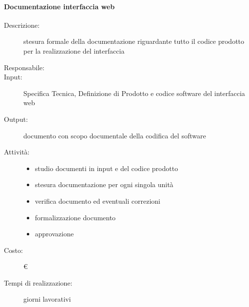 \paragraph{Documentazione interfaccia web}
\begin{description}
\item[Descrizione:] stesura formale della documentazione riguardante tutto il codice prodotto
per la realizzazione del interfaccia 

\item[Responsabile:] 

\item[Input:] Specifica Tecnica, Definizione di Prodotto e codice software del interfaccia web

\item[Output:] documento con scopo documentale della codifica del software

\item[Attività:]
\begin{itemize}
\item studio documenti in input e del codice prodotto
\item stesura documentazione per ogni singola unità
\item verifica documento ed eventuali correzioni
\item formalizzazione documento
\item approvazione
\end{itemize}
\item[Costo:] \euro 
\item[Tempi di realizzazione:]  giorni lavorativi
\end{description}



